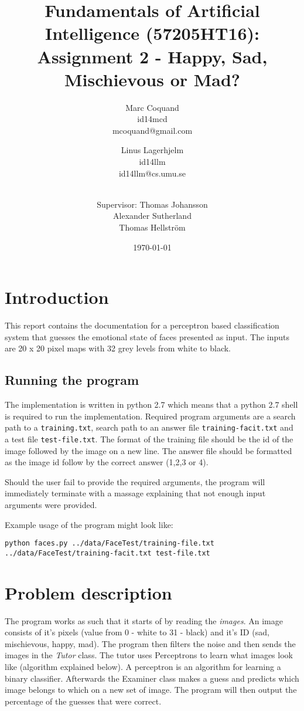 \documentclass[12pt]{article}
\title{Fundamentals of Artificial Intelligence (57205HT16): Assignment 2 -
Happy, Sad, Mischievous or Mad?}
\author{
    Marc Coquand \\ 
    id14mcd \\
    mcoquand@gmail.com \and
		Linus Lagerhjelm \\
		id14llm \\
		id14llm@cs.umu.se \and \\
		Supervisor: Thomas Johansson\\
		Alexander Sutherland \\
		Thomas Hellström
}
\date{\today}
\begin{document}
\maketitle

\newpage
\tableofcontents

\newpage
\section{Introduction}

This report contains the documentation for a perceptron based classification system
that guesses the emotional state of faces presented as input. The inputs are 20
x 20 pixel maps with 32 grey levels from white to black.

\subsection{Running the program}

The implementation is written in python 2.7 which means that a python 2.7 shell
is required to run the implementation. Required program arguments are a search
path to a \texttt{training.txt}, search path to an answer file
\texttt{training-facit.txt} and a test file \texttt{test-file.txt}. The format
of the training file should be the id of the image followed by the image on a
new line. The answer file should be formatted as the image id follow by the
correct answer (1,2,3 or 4).

Should the user fail to provide the required arguments, the program will
immediately terminate with a massage explaining that not enough input
arguments were provided.

Example usage of the program might look like:
\begin{verbatim}
python faces.py ../data/FaceTest/training-file.txt 
../data/FaceTest/training-facit.txt test-file.txt
\end{verbatim}





\section {Problem description}

The program works as such that it starts of by reading the \textit{images}. An
image consists of it's pixels (value from 0 - white to 31 - black) and it's ID
(sad, mischievous, happy, mad). The program then filters the noise and then
sends the images in the \textit{Tutor} class. The tutor uses Perceptrons to
learn what images look like (algorithm explained below). A perceptron is an
algorithm for learning a binary classifier. Afterwards the Examiner class makes
a guess and predicts which image belongs to which on a new set of image. The
program will then output the percentage of the guesses that were correct.
\end{document}
